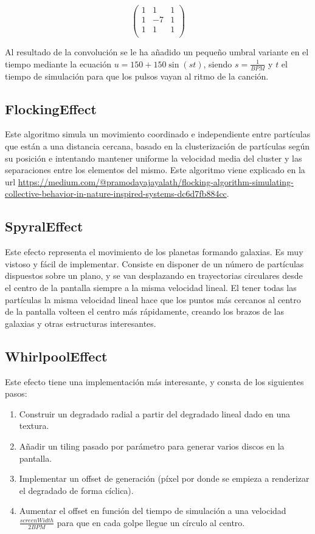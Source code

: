 \documentclass[12pt]{article}%
\begin{document}
\begin{equation}
	\begin{pmatrix}
		1 & 1 & 1 \\
		1 & -7 & 1 \\
		1 & 1 & 1 \\
	\end{pmatrix}
	\label{eq-matrix}
\end{equation}
	
	Al resultado de la convolución se le ha añadido un pequeño umbral variante en el tiempo mediante la ecuación $u=150 + 150\sin{(s t)}$, siendo $s=\frac{1}{BPM}$ y $t$ el tiempo de simulación para que los pulsos vayan al ritmo de la canción.
	
\subsection{FlockingEffect}
	Este algoritmo simula un movimiento coordinado e independiente entre partículas que están a una distancia cercana, basado en la clusterización de partículas según su posición e intentando mantener uniforme la velocidad media del cluster y las separaciones entre los elementos del mismo.
	Este algoritmo viene explicado en la url \url{https://medium.com/@pramodayajayalath/flocking-algorithm-simulating-collective-behavior-in-nature-inspired-systems-dc6d7fb884cc}.
	
\subsection{SpyralEffect}
	Este efecto representa el movimiento de los planetas formando galaxias. Es muy vistoso y fácil de implementar. Consiste en disponer de un número de partículas dispuestos sobre un plano, y se van desplazando en trayectorias circulares desde el centro de la pantalla siempre a la misma velocidad lineal. El tener todas las partículas la misma velocidad lineal hace que los puntos más cercanos al centro de la pantalla volteen el centro más rápidamente, creando los brazos de las galaxias y otras estructuras interesantes. 

\subsection{WhirlpoolEffect}
	Este efecto tiene una implementación más interesante, y consta de los siguientes pasos:
	\begin{enumerate}
		\item Construir un degradado radial a partir del degradado lineal dado en una textura.
		\item Añadir un tiling pasado por parámetro para generar varios discos en la pantalla.
		\item Implementar un offset de generación (píxel por donde se empieza a renderizar el degradado de forma cíclica).
		\item Aumentar el offset en función del tiempo de simulación a una velocidad $\frac{screenWidth}{2BPM}$ para que en cada golpe llegue un círculo al centro.
	\end{enumerate}
\end{document}
